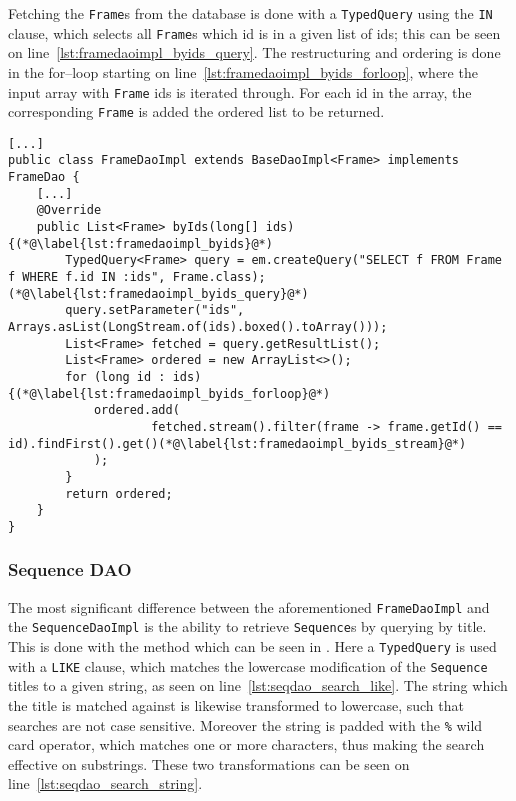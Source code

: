 Fetching the \texttt{Frame}s from the database is done with a \texttt{TypedQuery} using the \texttt{IN} clause, which selects all \texttt{Frame}s which id is in a given list of ids; this can be seen on line~\ref{lst:framedaoimpl_byids_query}.
The restructuring and ordering is done in the for--loop starting on line~\ref{lst:framedaoimpl_byids_forloop}, where the input array with \texttt{Frame} ids is iterated through.
For each id in the array, the corresponding \texttt{Frame} is added the ordered list to be returned.

\begin{lstlisting}[float, floatplacement=h, caption={Implementation of the \texttt{FrameDao} interface, used to retrieve \texttt{Frame}s from the database, using Hibernate. \texttt{[...]} denotes omitted code.}, label={lst:framedaoimpl}]
[...]
public class FrameDaoImpl extends BaseDaoImpl<Frame> implements FrameDao {
    [...]
    @Override
    public List<Frame> byIds(long[] ids) {(*@\label{lst:framedaoimpl_byids}@*)
        TypedQuery<Frame> query = em.createQuery("SELECT f FROM Frame f WHERE f.id IN :ids", Frame.class);(*@\label{lst:framedaoimpl_byids_query}@*)
        query.setParameter("ids", Arrays.asList(LongStream.of(ids).boxed().toArray()));
        List<Frame> fetched = query.getResultList();
        List<Frame> ordered = new ArrayList<>();
        for (long id : ids) {(*@\label{lst:framedaoimpl_byids_forloop}@*)
            ordered.add(
                    fetched.stream().filter(frame -> frame.getId() == id).findFirst().get()(*@\label{lst:framedaoimpl_byids_stream}@*)
            );
        }
        return ordered;
    }
}
\end{lstlisting}

\subsubsection{Sequence DAO}
The most significant difference between the aforementioned \texttt{FrameDaoImpl} and the \texttt{SequenceDaoImpl} is the ability to retrieve \texttt{Sequence}s by querying by title.
This is done with the method which can be seen in .
Here a \texttt{TypedQuery} is used with a \texttt{LIKE} clause, which matches the lowercase modification of the \texttt{Sequence} titles to a given string, as seen on line~\ref{lst:seqdao_search_like}.
The string which the title is matched against is likewise transformed to lowercase, such that searches are not case sensitive.
Moreover the string is padded with the \texttt{\%} wild card operator, which matches one or more characters, thus making the search effective on substrings.
These two transformations can be seen on line~\ref{lst:seqdao_search_string}.


